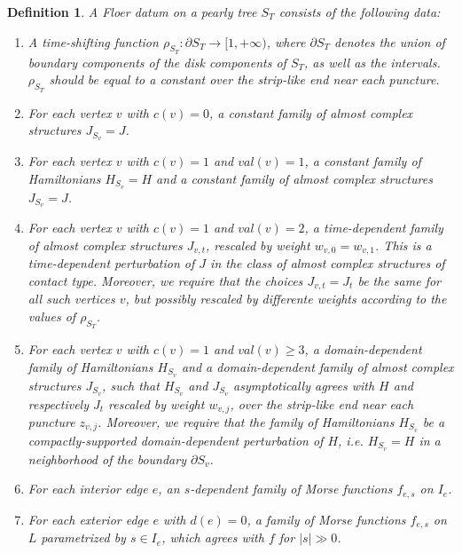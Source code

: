 \documentclass{amsart}
\newtheorem{definition}[theorem]{Definition}
\numberwithin{equation}{section}
\numberwithin{figure}{section}
\begin{document}
\begin{definition}
	A Floer datum on a pearly tree $S_{T}$ consists of the following data:
\begin{enumerate}[label=(\roman*)]

\item A time-shifting function $\rho_{S_{T}}: \partial S_{T} \to [1, +\infty)$, where $\partial S_{T}$ denotes the union of boundary components of the disk components of $S_{T}$, as well as the intervals. $\rho_{S_{T}}$ should be equal to a constant over the strip-like end near each puncture.

\item For each vertex $v$ with $c(v) = 0$, a constant family of almost complex structures $J_{S_{v}} = J$.

\item For each vertex $v$ with $c(v) = 1$ and $val(v) = 1$, a constant family of Hamiltonians $H_{S_{v}} = H$ and a constant family of almost complex structures $J_{S_{v}} = J$.

\item For each vertex $v$ with $c(v) = 1$ and $val(v) = 2$, a time-dependent family of almost complex structures $J_{v, t}$, rescaled by weight $w_{v, 0} = w_{v, 1}$. This is a time-dependent perturbation of $J$ in the class of almost complex structures of contact type. Moreover, we require that the choices $J_{v, t} = J_{t}$ be the same for all such vertices $v$, but possibly rescaled by differente weights according to the values of $\rho_{S_{T}}$.

\item For each vertex $v$ with $c(v) = 1$ and $val(v) \ge 3$, a domain-dependent family of Hamiltonians $H_{S_{v}}$ and a domain-dependent family of almost complex structures $J_{S_{v}}$, such that $H_{S_{v}}$ and $J_{S_{v}}$ asymptotically agrees with $H$ and respectively $J_{t}$ rescaled by weight $w_{v, j}$, over the strip-like end near each puncture $z_{v, j}$. Moreover, we require that the family of Hamiltonians $H_{S_{v}}$ be a compactly-supported domain-dependent perturbation of $H$, i.e. $H_{S_{v}} = H$ in a neighborhood of the boundary $\partial S_{v}$.

\item For each interior edge $e$, an $s$-dependent family of Morse functions $f_{e, s}$ on $I_{e}$.

\item For each exterior edge $e$ with $d(e) = 0$, a family of Morse functions $f_{e, s}$ on $L$ parametrized by $s \in I_{e}$, which agrees with $f$ for $|s| \gg 0$.


\end{enumerate}
\end{definition}
\end{document}
